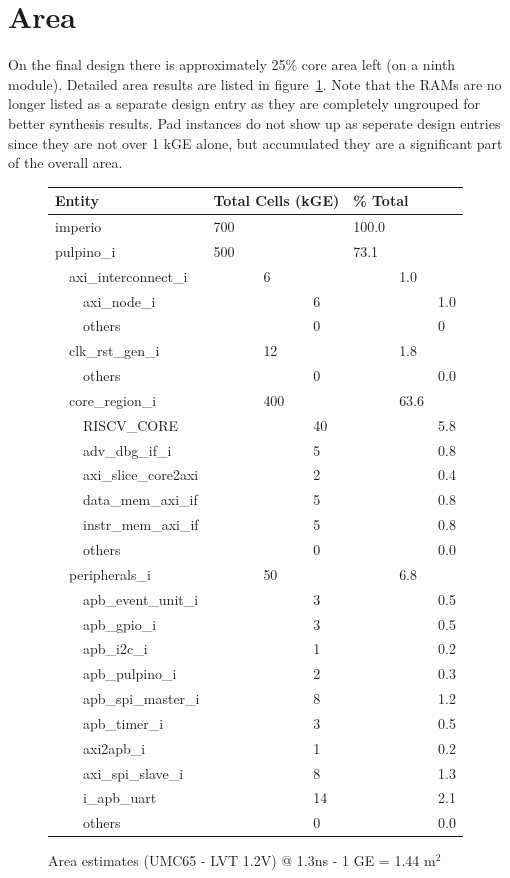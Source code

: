 \section{Area}

On the final design there is approximately 25\% core area left (on a ninth module). Detailed area results are listed in figure~\ref{fig:area}. Note that the RAMs are no longer listed as a separate design entry as they are completely ungrouped for better synthesis results. Pad instances do not show up as seperate design entries since they are not over 1 kGE alone, but accumulated they are a significant part of the overall area.

\begin{figure}[ht!]
\centering
\begin{tabularx}{\textwidth}{Xllllll}
\textbf{Entity} &  \multicolumn{3}{l}{\textbf{Total Cells (kGE)}}  &  \multicolumn{3}{l}{\textbf{\% Total}}  \\\hline
imperio&700&&&100.0&&\\
pulpino\_i&500&&&73.1&&\\
$\quad$axi\_interconnect\_i&&6&&&1.0&\\
$\quad\quad$axi\_node\_i&&&6&&&1.0\\
$\quad\quad$others &&&0&&&0\\
$\quad$clk\_rst\_gen\_i&&12&&&1.8&\\
$\quad\quad$others &&&0&&&0.0\\
$\quad$core\_region\_i&&400&&&63.6&\\
$\quad\quad$RISCV\_CORE&&&40&&&5.8\\
$\quad\quad$adv\_dbg\_if\_i&&&5&&&0.8\\
$\quad\quad$axi\_slice\_core2axi&&&2&&&0.4\\
$\quad\quad$data\_mem\_axi\_if&&&5&&&0.8\\
$\quad\quad$instr\_mem\_axi\_if&&&5&&&0.8\\
$\quad\quad$others &&&0&&&0.0\\
$\quad$peripherals\_i&&50&&&6.8&\\
$\quad\quad$apb\_event\_unit\_i&&&3&&&0.5\\
$\quad\quad$apb\_gpio\_i&&&3&&&0.5\\
$\quad\quad$apb\_i2c\_i&&&1&&&0.2\\
$\quad\quad$apb\_pulpino\_i&&&2&&&0.3\\
$\quad\quad$apb\_spi\_master\_i&&&8&&&1.2\\
$\quad\quad$apb\_timer\_i&&&3&&&0.5\\
$\quad\quad$axi2apb\_i&&&1&&&0.2\\
$\quad\quad$axi\_spi\_slave\_i&&&8&&&1.3\\
$\quad\quad$i\_apb\_uart&&&14&&&2.1\\
$\quad\quad$others &&&0&&&0.0\\
\end{tabularx}
\caption{Area estimates (UMC65 - LVT 1.2V) @ 1.3ns - 1 GE = 1.44 \textmu m$^2$}
\label{fig:area}
\end{figure}


